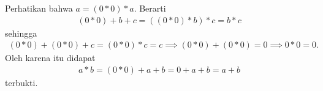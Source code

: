 
\begin{solusi}
    Perhatikan bahwa $a = (0*0)*a$. Berarti 
    \begin{align*}
        (0*0)+b+c=((0*0)*b)*c=b*c
    \end{align*}
    sehingga 
    \begin{align*}
        (0*0)+(0*0)+c=(0*0)*c=c \implies (0*0)+(0*0) = 0 \implies 0*0 = 0.
    \end{align*}
    Oleh karena itu didapat
    \begin{align*}
        a*b = (0*0)+a+b = 0+a+b=a+b
    \end{align*}
    terbukti.
\end{solusi}